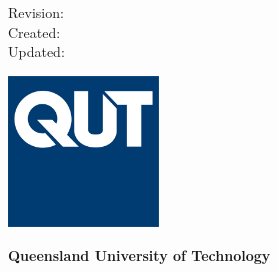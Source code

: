 \makeatletter %
\begin{titlepage}
    \begin{flushright}

        \ifdefined\technotedetails
            \large{\textbf{\technotedetails}}
        \fi
        \vspace*{4cm}

        \huge{\textbf{\@title}}
        \vspace*{2cm} 

        \small{\@author}
        \vspace*{2cm} 

        \small{Revision: \revision} \\
        \small{Created: \@date} \\
        \small{Updated: \daterevised}
        \vfill

        \includegraphics[width=0.3\textwidth]{qut-logo.jpg}

        \vspace*{0.5cm}
        \textbf{Queensland University of Technology} \\
        \small{\department}

    \end{flushright}
\end{titlepage}